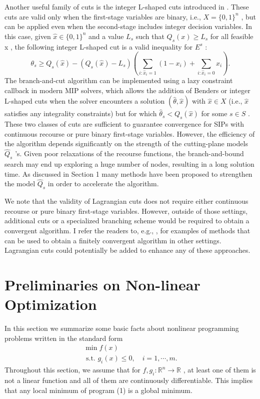\documentclass{article}
\theoremstyle{plain}
\theoremstyle{definition}
\begin{document}
Another useful family of cuts is the integer L-shaped cuts introduced in \cite{Laporte and Louveaux (1993)}. These cuts are valid only when the first-stage variables are binary, i.e.,  $X=\{0,1\}^{n}$ , but can be applied even when the second-stage includes integer decision variables. In this case, given  $\hat{x} \in\{0,1\}^{n}$  and a value  $L_{s}$  such that  $Q_{s}(x) \geq L_{s}$  for all feasible  x , the following integer L-shaped cut is a valid inequality for  $E^{s}$ :
\begin{equation}
\theta_{s} \geq Q_{s}(\hat{x})-\left(Q_{s}(\hat{x})-L_{s}\right)\left(\sum_{i: \hat{x}_{i}=1}\left(1-x_{i}\right)+\sum_{i: \hat{x}_{i}=0} x_{i}\right) .
\end{equation}
The branch-and-cut algorithm can be implemented using a lazy constraint callback in modern MIP solvers, which allows the addition of Benders or integer L-shaped cuts when the solver encounters a solution  $(\hat{\theta}, \hat{x})$  with $ \hat{x} \in X$  (i.e.,  $\hat{x}$  satisfies any integrality constraints) but for which  $\hat{\theta}_{s}<Q_{s}(\hat{x})$  for some  $s \in S$ . These two classes of cuts are sufficient to guarantee convergence for SIPs with continuous recourse or pure binary first-stage variables. However, the efficiency of the algorithm depends significantly on the strength of the cutting-plane models  $\hat{Q}_{s}$ 's. Given poor relaxations of the recourse functions, the branch-and-bound search may end up exploring a huge number of nodes, resulting in a long solution time. As discussed in Section 1 many methods have been proposed to strengthen the model  $\hat{Q}_{s}$  in order to accelerate the algorithm.

We note that the validity of Lagrangian cuts does not require either continuous recourse or pure binary first-stage variables. However, outside of those settings, additional cuts or a specialized branching scheme would be required to obtain a convergent algorithm. I refer the readers to, e.g.,  \cite{Ahmed and Sahinidis 2003}, \cite{Zhang and Kucukyavuz 2014} for examples of methods that can be used to obtain a finitely convergent algorithm in other settings. Lagrangian cuts could potentially be added to enhance any of these approaches.

\section{Preliminaries on Non-linear Optimization}
In this section we summarize some basic facts about nonlinear programming problems written in the standard form
\begin{equation}
\begin{array}{l}
\min f(x) \\
\text { s.t. } g_{i}(x) \leq 0, \quad i=1, \cdots, m .
\end{array}
\end{equation}
Throughout this section, we assume  that for  $f, g_{i}: \mathbb{R}^{n} \longrightarrow \mathbb{R}$ , at least one of them is not a linear function and all of them are continuously differentiable. This implies that any local minimum of program (1) is a global minimum.
\end{document}
